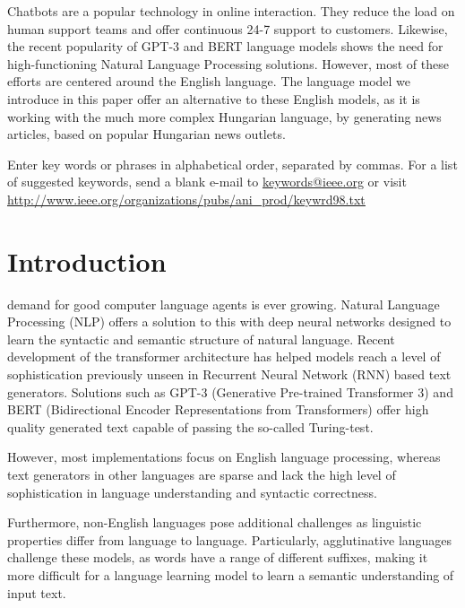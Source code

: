 \documentclass[journal]{IEEEtai}
\begin{document}
\begin{IEEEImpStatement}
Chatbots are a popular technology in online interaction. They reduce the load on human support teams and offer continuous 24-7 support to customers. Likewise, the recent popularity of GPT-3 and BERT language models shows the need for high-functioning Natural Language Processing solutions. However, most of these efforts are centered around the English language. The language model we introduce in this paper offer an alternative to these English models, as it is working with the much more complex Hungarian language, by generating news articles, based on popular Hungarian news outlets.
\end{IEEEImpStatement}

\begin{IEEEkeywords}
Enter key words or phrases in alphabetical order, separated by commas. For a list of suggested keywords, send a blank e-mail to \href{mailto:keywords@ieee.org}{\underline{keywords@ieee.org}} or visit \href{http://www.ieee.org/organizations/pubs/ani_prod/keywrd98.txt}{\underline{http://www.ieee.org/organizations/pubs/ani\_prod/keywrd98.txt}}
\end{IEEEkeywords}



\section{Introduction}

 demand for good computer language agents is ever growing. Natural Language Processing (NLP) offers a solution to this with deep neural networks designed to learn the syntactic and semantic structure of natural language. Recent development of the transformer architecture\cite{vaswani2017attention} has helped models reach a level of sophistication previously unseen in Recurrent Neural Network (RNN) based text generators. Solutions such as GPT-3\cite{brown2020language} (Generative Pre-trained Transformer 3) and BERT\cite{devlin2019bert} (Bidirectional Encoder Representations from Transformers) offer high quality generated text capable of passing the so-called Turing-test\cite{TuringMind}.

However, most implementations focus on English language processing, whereas text generators in other languages are sparse and lack the high level of sophistication in language understanding and syntactic correctness. 

Furthermore, non-English languages pose additional challenges as linguistic properties differ from language to language. Particularly, agglutinative languages challenge these models, as words have a range of different suffixes, making it more difficult for a language learning model to learn a semantic understanding of input text.
\end{document}
